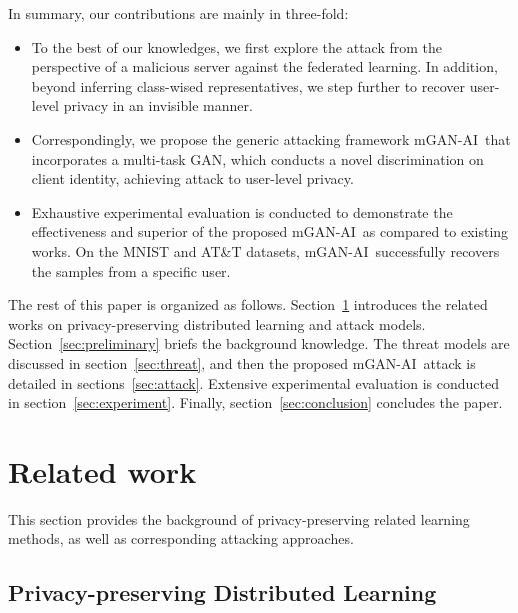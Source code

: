 \documentclass[10pt, conference, letterpaper]{IEEEtran}
\newcommand{\alg}{mGAN-AI}
\begin{document}
In summary, our contributions are mainly in three-fold:
\begin{itemize}

\item To the best of our knowledges, we first explore the attack from the perspective of a malicious server against the federated learning. In addition, beyond inferring class-wised representatives, we step further to recover user-level privacy in an invisible manner.

\item Correspondingly, we propose the generic attacking framework \alg~that incorporates a multi-task GAN, which conducts a novel discrimination on client identity, achieving attack to user-level privacy.

\item Exhaustive experimental evaluation is conducted to demonstrate the effectiveness and superior of the proposed \alg~as compared to existing works. On the MNIST and AT\&T datasets, \alg~successfully recovers the samples from a specific user.

\end{itemize}

The rest of this paper is organized as follows. Section~\ref{sec:related} introduces the related works on privacy-preserving distributed learning and attack models. Section~\ref{sec:preliminary} briefs the background knowledge. The threat models are discussed in section~\ref{sec:threat}, and then the proposed \alg~attack is detailed in sections~\ref{sec:attack}. Extensive experimental evaluation is conducted in section~\ref{sec:experiment}. Finally, section~\ref{sec:conclusion} concludes the paper.


\section{Related work}\label{sec:related}

This section provides the background of privacy-preserving related learning methods, as well as corresponding attacking approaches.

\subsection{Privacy-preserving Distributed Learning}
\end{document}
